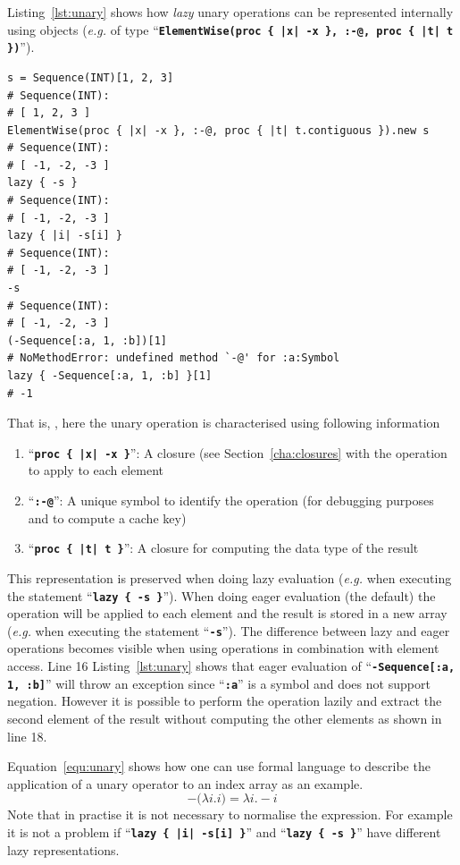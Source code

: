 \documentclass[12pt,a4paper,oneside,openright]{book}
\newcommand{\eg}{\emph{e.g.} }
\newcommand{\Eg}{For example }
\newcommand{\Ie}{That is, }
\newcommand{\sct}[1]{Section~\ref{cha:#1}}
\newcommand{\equ}[1]{Equation~\ref{equ:#1}}
\newcommand{\lst}[1]{Listing~\ref{lst:#1}}
\newcommand{\code}[1]{``\texttt{\textbf{\textcolor{codegray}{\small{#1}}}}''}
\begin{document}
\begin{CJK}{UTF8}{}
\lst{unary} shows how \emph{lazy} unary operations can be represented internally using objects (\eg of type \code{ElementWise(proc \{ |x| -x \}, :-@, proc \{ |t| t \})}).
\lstset{language=Ruby,frame=single,numbers=left}
\begin{lstlisting}[float=htbp,caption={Internal representation of unary operations},escapechar=\$,label=lst:unary]
s = Sequence(INT)[1, 2, 3]
# Sequence(INT):
# [ 1, 2, 3 ]
ElementWise(proc { |x| -x }, :-@, proc { |t| t.contiguous }).new s
# Sequence(INT):
# [ -1, -2, -3 ]
lazy { -s }
# Sequence(INT):
# [ -1, -2, -3 ]
lazy { |i| -s[i] }
# Sequence(INT):
# [ -1, -2, -3 ]
-s
# Sequence(INT):
# [ -1, -2, -3 ]
(-Sequence[:a, 1, :b])[1]
# NoMethodError: undefined method `-@' for :a:Symbol
lazy { -Sequence[:a, 1, :b] }[1]
# -1
\end{lstlisting}
\Ie, here the unary operation is characterised using following information
\begin{enumerate}
\item \code{proc \{ |x| -x \}}: A closure (see \sct{closures} with the operation to apply to each element
\item \code{:-@}: A unique symbol to identify the operation (for debugging purposes and to compute a cache key)
\item \code{proc \{ |t| t \}}: A closure for computing the data type of the result
\end{enumerate}
This representation is preserved when doing lazy evaluation (\eg when executing the statement \code{lazy \{ -s \}}).
When doing eager evaluation (the default) the operation will be applied to each element and the result is stored in a new array (\eg when executing the statement \code{-s}).
The difference between lazy and eager operations becomes visible when using operations in combination with element access. Line 16 \lst{unary} shows that eager evaluation of \code{-Sequence[:a, 1, :b]} will throw an exception since \code{:a} is a symbol and does not support negation. However it is possible to perform the operation lazily and extract the second element of the result without computing the other elements as shown in line 18.

\equ{unary} shows how one can use formal language to describe the application of a unary operator to an index array as an example.
\begin{equation}\label{equ:unary}
  -\big(\lambda i.i\big)=\lambda i.-i
\end{equation}
Note that in practise it is not necessary to normalise the expression. \Eg it is not a problem if \code{lazy \{ |i| -s[i] \}} and \code{lazy \{ -s \}} have different lazy representations.


\end{CJK}
\end{document}
